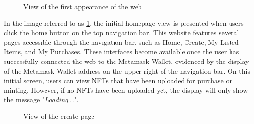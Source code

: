 \begin{figure} [H] \centering
  \caption{View of the first appearance of the web}
  \label{fig:homepage}
  \end{figure}

  In the image referred to as \ref{fig:homepage}, the initial homepage view is presented when users click the home button on the top navigation bar. This website features several pages accessible through the navigation bar, such as Home, Create, My Listed Items, and My Purchases. These interfaces become available once the user has successfully connected the web to the Metamask Wallet, evidenced by the display of the Metamask Wallet address on the upper right of the navigation bar. On this initial screen, users can view NFTs that have been uploaded for purchase or minting. However, if no NFTs have been uploaded yet, the display will only show the message "\emph{Loading...}".
   
  \begin{figure} [H] \centering
    \caption{View of the create page}
    \label{fig:createpage}
    \end{figure}

